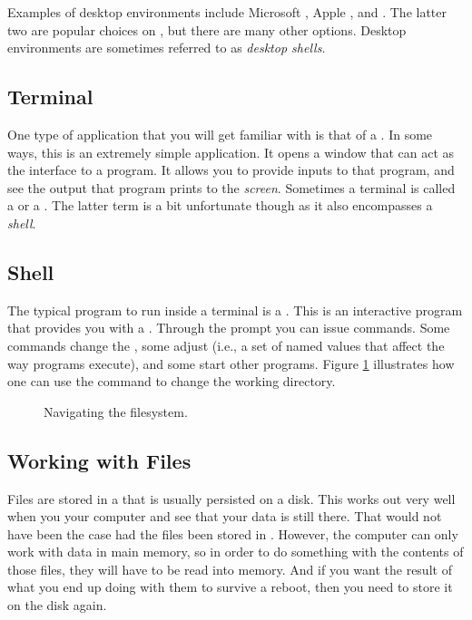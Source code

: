 Examples of desktop environments include Microsoft , Apple ,  and . The latter two are popular choices on , but there are many other options. Desktop environments are sometimes referred to as \textsl{desktop shells}.

\subsection{Terminal}

One type of application that you will get familiar with is that of a . In some ways, this is an extremely simple application. It opens a window that can act as the interface to a  program. It allows you to provide inputs to that program, and see the output that program prints to the \textsl{screen}. Sometimes a terminal is called a  or a . The latter term is a bit unfortunate though as it also encompasses a \textsl{shell}.

\subsection{Shell}

The typical program to run inside a terminal is a . This is an interactive program that provides you with a . Through the prompt you can issue commands. Some commands change the , some adjust  (i.e., a set of named values that affect the way programs execute), and some start other programs. Figure \ref{fig:bg:processes:navigation} illustrates how one can use the  command to change the working directory.

\begin{figure}[tbp]
  
  \caption{Navigating the filesystem.}
  \label{fig:bg:processes:navigation}
\end{figure}

\subsection{Working with Files}

Files are stored in a  that is usually persisted on a disk. This works out very well when you  your computer and see that your data is still there. That would not have been the case had the files been stored in . However, the computer can only work with data in main memory, so in order to do something with the contents of those files, they will have to be read into memory. And if you want the result of what you end up doing with them to survive a reboot, then you need to store it on the disk again.

